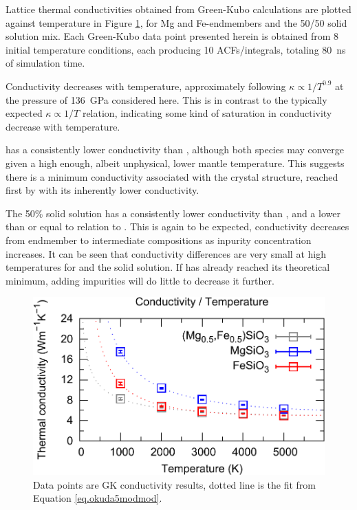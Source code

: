 Lattice thermal conductivities obtained from Green-Kubo calculations are plotted against temperature in Figure \ref{fig:kappa-temp_01}, for Mg and Fe-endmembers and the 50/50 solid solution mix. Each Green-Kubo data point presented herein is obtained from 8 initial temperature conditions, each producing 10 ACFs/integrals, totaling 80~ns of simulation time.

Conductivity decreases with temperature, approximately following $\kappa \propto 1/T^{0.9}$ at the pressure of 136~GPa considered here. This is in contrast to the typically expected $\kappa \propto 1/T$ relation, indicating some kind of saturation in conductivity decrease with temperature.

\fesios has a consistently lower conductivity than \mgsio, although both species may converge given a high enough, albeit unphysical, lower mantle temperature. This suggests there is a minimum conductivity associated with the crystal structure, reached first by \fesios with its inherently lower conductivity.

The 50\% solid solution has a consistently lower conductivity than \mgsio, and a lower than or equal to relation to \fesios. This is again to be expected, conductivity decreases from endmember to intermediate compositions as inpurity concentration increases. It can be seen that conductivity differences are very small at high temperatures for \fesios and the solid solution. If \fesios has already reached its theoretical minimum, adding impurities will do little to decrease it further.

\begin{figure}[h!]
  \includegraphics[width=\linewidth]{Figures/k-t_all_02.png}
  \caption[CONTENTS BIT]{Data points are GK conductivity results, dotted line is the fit from Equation \ref{eq.okuda5modmod}.}
  \label{fig:kappa-temp_01}
\end{figure}

